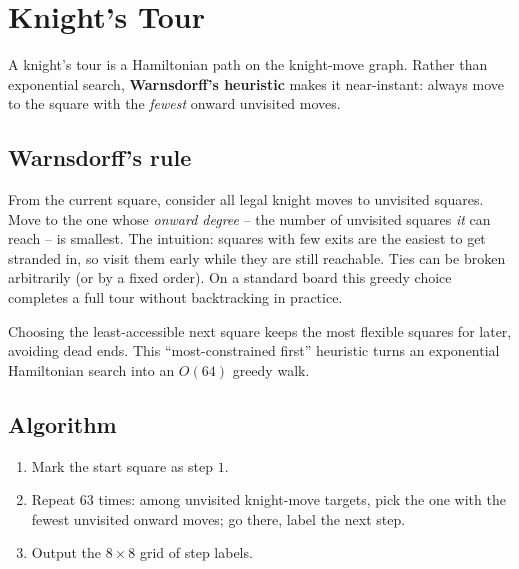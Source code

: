 \section{Knight's Tour}
\label{sec:cses-knights-tour}


\begin{patternbox}
A knight's tour is a Hamiltonian path on the knight-move graph. Rather than
exponential search, \textbf{Warnsdorff's heuristic} makes it near-instant:
always move to the square with the \emph{fewest} onward unvisited moves.
\end{patternbox}

\subsection*{Warnsdorff's rule}

From the current square, consider all legal knight moves to unvisited
squares. Move to the one whose \emph{onward degree} -- the number of
unvisited squares \emph{it} can reach -- is smallest. The intuition:
squares with few exits are the easiest to get stranded in, so visit them
early while they are still reachable. Ties can be broken arbitrarily (or by
a fixed order). On a standard board this greedy choice completes a full tour
without backtracking in practice.

\begin{ideabox}
Choosing the least-accessible next square keeps the most flexible squares
for later, avoiding dead ends. This ``most-constrained first'' heuristic
turns an exponential Hamiltonian search into an $O(64)$ greedy walk.
\end{ideabox}

\subsection*{Algorithm}

\begin{enumerate}
  \item Mark the start square as step $1$.
  \item Repeat $63$ times: among unvisited knight-move targets, pick the
        one with the fewest unvisited onward moves; go there, label the
        next step.
  \item Output the $8\times8$ grid of step labels.
\end{enumerate}

